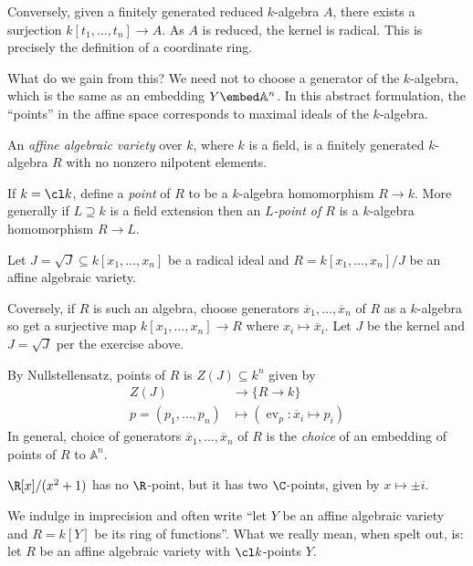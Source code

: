 \documentclass[a4paper]{article}
\renewcommand{\A}{\mathbb{A}}
\DeclareMathOperator{\ev}{ev}
\begin{document}
Conversely, given a finitely generated reduced \(k\)-algebra \(A\), there exists a surjection \(k[t_1, \dots, t_n] \to A\). As \(A\) is reduced, the kernel is radical. This is precisely the definition of a coordinate ring.

What do we gain from this? We need not to choose a generator of the \(k\)-algebra, which is the same as an embedding \(Y \embed \A^n\). In this abstract formulation, the ``points'' in the affine space corresponds to maximal ideals of the \(k\)-algebra.

\begin{definition}
  An \emph{affine algebraic variety} over \(k\), where \(k\) is a field, is a finitely generated \(k\)-algebra \(R\) with no nonzero nilpotent elements.

  If \(k = \cl k\), define a \emph{point} of \(R\) to be a \(k\)-algebra homomorphism \(R \to k\). More generally if \(L \supseteq k\) is a field extension then an \emph{\(L\)-point of \(R\)} is a \(k\)-algebra homomorphism \(R \to L\).
\end{definition}

\begin{eg}
  Let \(J = \sqrt J \subseteq k[x_1, \dots, x_n]\) be a radical ideal and \(R = k[x_1, \dots, x_n]/J\) be an affine algebraic variety.
  
  Coversely, if \(R\) is such an algebra, choose generators \(\overline x_1, \dots, \overline x_n\) of \(R\) as a \(k\)-algebra so get a surjective map \(k[x_1, \dots, x_n] \to R\) where \(x_i \mapsto \overline x_i\). Let \(J\) be the kernel and \(J = \sqrt J\) per the exercise above.

  By Nullstellensatz, points of \(R\) is \(Z(J) \subseteq k^n\) given by
  \begin{align*}
    Z(J) &\to \{R \to k\} \\
    p = (p_1, \dots, p_n) &\mapsto (\ev_p: \overline x_i \mapsto p_i)
  \end{align*}
  In general, choice of generators \(\overline x_1, \dots, \overline x_n\) of \(R\) is the \emph{choice} of an embedding of points of \(R\) to \(\A^n\).
\end{eg}

\begin{eg}
  \(\R[x]/(x^2 + 1)\) has no \(\R\)-point, but it has two \(\C\)-points, given by \(x \mapsto \pm i\).
\end{eg}

We indulge in imprecision and often write ``let \(Y\) be an affine algebraic variety and \(R = k[Y]\) be its ring of functions''. What we really mean, when spelt out, is: let \(R\) be an affine algebraic variety with \(\cl k\)-points \(Y\).
\end{document}
